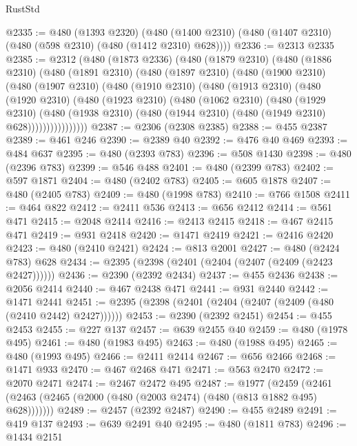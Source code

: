\begin{lexlean}{RustStd}
\begin{coremodule}
{\begin{coremodule}
{{{{{{{{{{{{{{{{{{{{{{{{{{{{{{{{{@2335 := @480
    (@1393 @2320)
    (@480 (@1400 @2310) (@480 (@1407 @2310) (@480 (@598 @2310) (@480 (@1412 @2310) @628))))
@2336 := @2313 @2335
@2385 := @2312
    (@480
      (@1873 @2336)
      (@480
        (@1879 @2310)
        (@480
          (@1886 @2310)
          (@480
            (@1891 @2310)
            (@480
              (@1897 @2310)
              (@480
                (@1900 @2310)
                (@480
                  (@1907 @2310)
                  (@480
                    (@1910 @2310)
                    (@480
                      (@1913 @2310)
                      (@480
                        (@1920 @2310)
                        (@480
                          (@1923 @2310)
                          (@480
                            (@1062 @2310)
                            (@480
                              (@1929 @2310)
                              (@480
                                (@1938 @2310)
                                (@480 (@1944 @2310) (@480 (@1949 @2310) @628))))))))))))))))
@2387 := @2306 (@2308 @2385)
@2388 := @455 @2387
@2389 := @461 @246
@2390 := @2389 @40
@2392 := @476 @40 @469
@2393 := @484 @637
@2395 := @480 (@2393 @783)
@2396 := @508 @1430
@2398 := @480 (@2396 @783)
@2399 := @546 @488
@2401 := @480 (@2399 @783)
@2402 := @597 @1871
@2404 := @480 (@2402 @783)
@2405 := @605 @1878
@2407 := @480 (@2405 @783)
@2409 := @480 (@1998 @783)
@2410 := @766 @1508
@2411 := @464 @822
@2412 := @2411 @536
@2413 := @656 @2412
@2414 := @561 @471
@2415 := @2048 @2414
@2416 := @2413 @2415
@2418 := @467 @2415 @471
@2419 := @931 @2418
@2420 := @1471 @2419
@2421 := @2416 @2420
@2423 := @480 (@2410 @2421)
@2424 := @813 @2001
@2427 := @480 (@2424 @783) @628
@2434 := @2395 (@2398 (@2401 (@2404 (@2407 (@2409 (@2423 @2427))))))
@2436 := @2390 (@2392 @2434)
@2437 := @455 @2436
@2438 := @2056 @2414
@2440 := @467 @2438 @471
@2441 := @931 @2440
@2442 := @1471 @2441
@2451 := @2395 (@2398 (@2401 (@2404 (@2407 (@2409 (@480 (@2410 @2442) @2427))))))
@2453 := @2390 (@2392 @2451)
@2454 := @455 @2453
@2455 := @227 @137
@2457 := @639 @2455 @40
@2459 := @480 (@1978 @495)
@2461 := @480 (@1983 @495)
@2463 := @480 (@1988 @495)
@2465 := @480 (@1993 @495)
@2466 := @2411 @2414
@2467 := @656 @2466
@2468 := @1471 @933
@2470 := @467 @2468 @471
@2471 := @563 @2470
@2472 := @2070 @2471
@2474 := @2467 @2472 @495
@2487 := @1977
    (@2459 (@2461 (@2463 (@2465 (@2000 (@480 (@2003 @2474) (@480 (@813 @1882 @495) @628)))))))
@2489 := @2457 (@2392 @2487)
@2490 := @455 @2489
@2491 := @419 @137
@2493 := @639 @2491 @40
@2495 := @480 (@1811 @783)
@2496 := @1434 @2151
}}}}}}}}}}}}}}}}}}}}}}}}}}}}}}}}}
\end{coremodule}}
\end{coremodule}
\end{lexlean}
